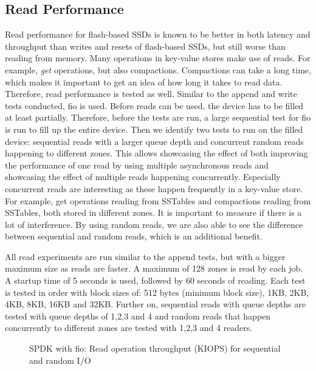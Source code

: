 \subsection{Read Performance}
\label{sec:read}
Read performance for flash-based SSDs is known to be better in both latency and throughput than writes and resets of flash-based SSDs, but still worse than reading from memory. Many operations in key-value stores make use of reads. For example, \textit{get} operations, but also compactions. Compactions can take a long time, which makes it important to get an idea of how long it takes to read data. Therefore, read performance is tested as well. Similar to the append and write tests conducted, fio is used. Before reads can be used, the device has to be filled at least partially. Therefore, before the tests are run, a large sequential test for fio is run to fill up the entire device. Then we identify two tests to run on the filled device: sequential reads with a larger queue depth and concurrent random reads happening to different zones. This allows showcasing the effect of both improving the performance of one read by using multiple asynchronous reads and showcasing the effect of multiple reads happening concurrently. Especially concurrent reads are interesting as these happen frequently in a key-value store. For example, get operations reading from SSTables and compactions reading from SSTables, both stored in different zones. It is important to measure if there is a lot of interference. By using random reads, we are also able to see the difference between sequential and random reads, which is an additional benefit.

All read experiments are run similar to the append tests, but with a bigger maximum size as reads are faster. A maximum of 128 zones is read by each job. A startup time of 5 seconds is used, followed by 60 seconds of reading. Each test is tested in order with block sizes of: 512 bytes (minimum block size), 1KB, 2KB, 4KB, 8KB, 16KB and 32KB. Further on, sequential reads with queue depths are tested with queue depths of 1,2,3 and 4 and random reads that happen concurrently to different zones are tested with 1,2,3 and 4 readers.


\begin{figure}[!ht]
    \hspace*{-0.075\textwidth} %
    \raggedleft
    \caption{ SPDK with fio: Read operation throughput (KIOPS) for sequential and random I/O   }
    \label{fig:spdkreadsseqrandthrough}
\end{figure}


